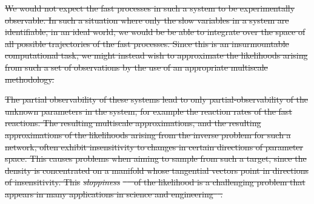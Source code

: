 \documentclass[final]{siamltex}
\providecommand{\DIFdel}[1]{{\protect\color{red}\sout{#1}}}                      %
\providecommand{\DIFdelbegin}{} %
\providecommand{\DIFdelend}{} %
\newcommand{\DIFscaledelfig}{0.5}
\newlength{\DIFdelgraphicswidth} %
\newlength{\DIFdelgraphicsheight} %
\newcommand{\DIFdelincludegraphics}[2][]{%
\sbox{\DIFdelgraphicsbox}{\DIFOincludegraphics[#1]{#2}}%
\settoboxwidth{\DIFdelgraphicswidth}{\DIFdelgraphicsbox} %
\settoboxtotalheight{\DIFdelgraphicsheight}{\DIFdelgraphicsbox} %
\scalebox{\DIFscaledelfig}{%
\parbox[b]{\DIFdelgraphicswidth}{\usebox{\DIFdelgraphicsbox}\\[-\baselineskip] \rule{\DIFdelgraphicswidth}{0em}}\llap{\resizebox{\DIFdelgraphicswidth}{\DIFdelgraphicsheight}{%
\setlength{\unitlength}{\DIFdelgraphicswidth}%
\begin{picture}(1,1)%
\thicklines\linethickness{2pt} %
{\color[rgb]{1,0,0}\put(0,0){\framebox(1,1){}}}%
{\color[rgb]{1,0,0}\put(0,0){\line( 1,1){1}}}%
{\color[rgb]{1,0,0}\put(0,1){\line(1,-1){1}}}%
\end{picture}%
}\hspace*{3pt}}} %
} %
\DeclareRobustCommand{\DIFdelbegin}{\DIFOdelbegin \let\includegraphics\DIFdelincludegraphics} %
\DeclareRobustCommand{\DIFdelend}{\DIFOaddend \let\includegraphics\DIFOincludegraphics} %
\begin{document}
\DIFdelbegin \DIFdel{We would not expect the fast processes in such a system to be
experimentally observable. In such a situation where only the slow
variables in a system are identifiable, in an ideal world, we would be
be able to integrate over the space of all possible trajectories of
the fast processes. Since this is an insurmountable computational
task, we might instead wish to approximate the likelihoods arising
from such a set of observations by the use of an appropriate
multiscale methodology.
}\DIFdelend %

\DIFdelbegin \DIFdel{The partial observability of these systems lead to only
partial-observability of the unknown parameters in the system, for
example the reaction rates of the fast reactions. The resulting
multiscale approximations, and the resulting approximations of the
likelihoods arising from the inverse problem for such a network, 
often exhibit 
insensitivity to changes in certain directions of
parameter space. This causes problems when aiming to sample from such
a target, since the density is concentrated on a manifold whose
tangential vectors point in directions of insensitivity. This
}\emph{\DIFdel{sloppiness}}%
\DIFdel{\mbox{%
\cite{gutenkunst2007universally,apgar2010sloppy} }\hspace{0pt}%
of the likelihood is a challenging problem
that appears in many applications in science and engineering\mbox{%
\cite{constantine2014active}}\hspace{0pt}%
.
}\DIFdelend %
\end{document}
